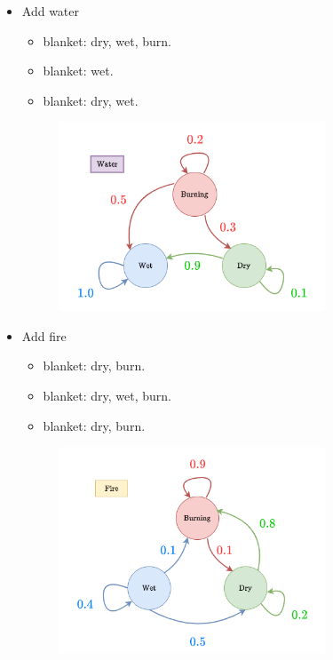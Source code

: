         \begin{itemize}
            \item Add water
                \begin{itemize}
                    \item {} blanket:  dry,  wet,  burn.
                    \item {} blanket:  wet.
                    \item {} blanket:  dry,  wet.
                \end{itemize}

                \begin{figure}[H]
                    \centering
                    \includegraphics[width=80mm,scale=0.4]{images/mdp_images/add_water_transition.png}
                \end{figure}
        \end{itemize}

        \begin{itemize}
            \item Add fire
                \begin{itemize}
                    \item {} blanket:  dry,  burn.
                    \item {} blanket:  dry,  wet,  burn.
                    \item {} blanket:  dry,   burn.
                \end{itemize}

                \begin{figure}[H]
                    \centering
                    \includegraphics[width=80mm,scale=0.4]{images/mdp_images/add_fire_transition.png}
                \end{figure}
        \end{itemize}

